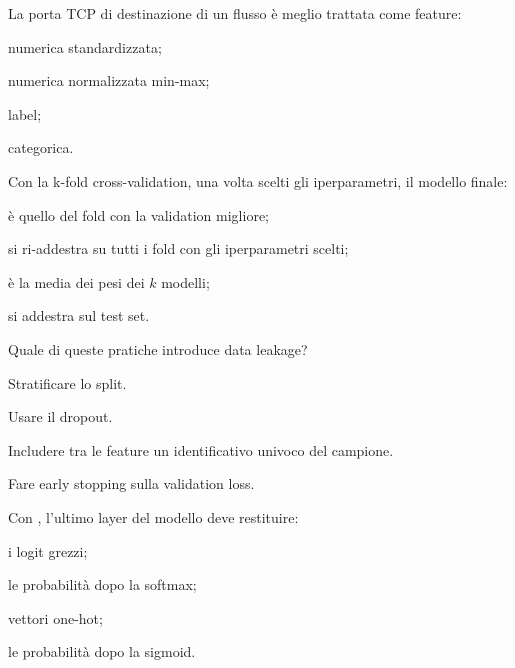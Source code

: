 \begin{domanda}\label{quiz:m19}
La porta TCP di destinazione di un flusso è meglio trattata come feature:
\begin{opzioni}
  \item numerica standardizzata;
  \item numerica normalizzata min-max;
  \item label;
  \item categorica.
\end{opzioni}
\end{domanda}

\begin{domanda}\label{quiz:m20}
Con la k-fold cross-validation, una volta scelti gli iperparametri, il modello finale:
\begin{opzioni}
  \item è quello del fold con la validation migliore;
  \item si ri-addestra su tutti i fold con gli iperparametri scelti;
  \item è la media dei pesi dei $k$ modelli;
  \item si addestra sul test set.
\end{opzioni}
\end{domanda}

\begin{domanda}\label{quiz:m21}
Quale di queste pratiche introduce data leakage?
\begin{opzioni}
  \item Stratificare lo split.
  \item Usare il dropout.
  \item Includere tra le feature un identificativo univoco del campione.
  \item Fare early stopping sulla validation loss.
\end{opzioni}
\end{domanda}

\begin{domanda}\label{quiz:m22}
Con , l'ultimo layer del modello deve restituire:
\begin{opzioni}
  \item i logit grezzi;
  \item le probabilità dopo la softmax;
  \item vettori one-hot;
  \item le probabilità dopo la sigmoid.
\end{opzioni}
\end{domanda}

